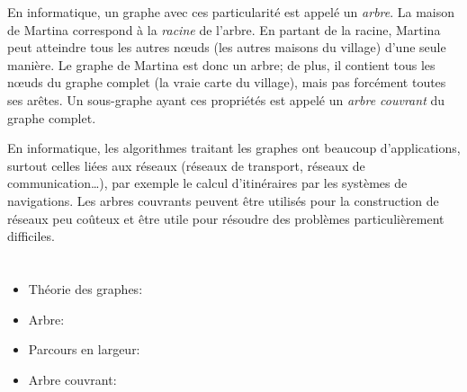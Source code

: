 {{En informatique, un graphe avec ces particularité est appelé un \emph{arbre}. La maison de Martina correspond à la \emph{racine} de l’arbre. En partant de la racine, Martina peut atteindre tous les autres nœuds (les autres maisons du village) d’une seule manière. Le graphe de Martina est donc un arbre; de plus, il contient tous les nœuds du graphe complet (la vraie carte du village), mais pas forcément toutes ses arêtes. Un sous-graphe ayant ces propriétés est appelé un \emph{arbre couvrant} du graphe complet.

En informatique, les algorithmes traitant les graphes ont beaucoup d’applications, surtout celles liées aux réseaux (réseaux de transport, réseaux de communication…), par exemple le calcul d’itinéraires par les systèmes de navigations. Les arbres couvrants peuvent être utilisés pour la construction de réseaux peu coûteux et être utile pour résoudre des problèmes particulièrement difficiles.



\section*{\BrochureWebsitesAndKeywords}
{\raggedright
\begin{itemize}
  \item Théorie des graphes: \href{https://fr.wikipedia.org/wiki/Th\%C3\%A9orie_des_graphes}{}
  \item Arbre: \href{https://fr.wikipedia.org/wiki/Arbre_(th\%C3\%A9orie_des_graphes)}{}
  \item Parcours en largeur: \href{https://fr.wikipedia.org/wiki/Algorithme_de_parcours_en_largeur}{}
  \item Arbre couvrant: \href{https://fr.wikipedia.org/wiki/Arbre_couvrant}{}
\end{itemize}


}

}{}

\def\AuthorGutierrezJ{} %
\def\AuthorLunaC{} %
\def\AuthorSchluterK{} %
\def\AuthorSerafiniG{} %
\def\AuthorIkramovA{} %
\def\AuthorDatzkoThutS{} %
\def\AuthorPelletE{} %

\newpage}{}
